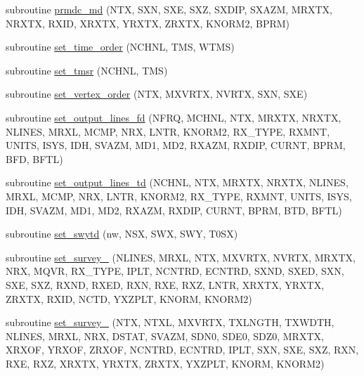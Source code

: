 \begin{DoxyCompactItemize}
\item 
subroutine \hyperlink{Leroi__c_8f90_a2212318f6dd3a1fda873532ddfb09348}{prmdc\+\_\+md} (N\+TX, S\+XN, S\+XE, S\+XZ, S\+X\+D\+IP, S\+X\+A\+ZM, M\+R\+X\+TX, N\+R\+X\+TX, R\+X\+ID, X\+R\+X\+TX, Y\+R\+X\+TX, Z\+R\+X\+TX, K\+N\+O\+R\+M2, B\+P\+RM)
\item 
subroutine \hyperlink{Leroi__c_8f90_ab7ca289c09589698d4ff1bd15e1a16e6}{set\+\_\+time\+\_\+order} (N\+C\+H\+NL, T\+MS, W\+T\+MS)
\item 
subroutine \hyperlink{Leroi__c_8f90_a404aa1badfba9369219343ec158c37ca}{set\+\_\+tmsr} (N\+C\+H\+NL, T\+MS)
\item 
subroutine \hyperlink{Leroi__c_8f90_a0cb3e794e8c12de92dbc3e157d7991c4}{set\+\_\+vertex\+\_\+order} (N\+TX, M\+X\+V\+R\+TX, N\+V\+R\+TX, S\+XN, S\+XE)
\item 
subroutine \hyperlink{Leroi__c_8f90_a25dab6f0be9119c8c046915473136d9c}{set\+\_\+output\+\_\+lines\+\_\+fd} (N\+F\+RQ, M\+C\+H\+NL, N\+TX, M\+R\+X\+TX, N\+R\+X\+TX, N\+L\+I\+N\+ES, M\+R\+XL, M\+C\+MP, N\+RX, L\+N\+TR, K\+N\+O\+R\+M2, R\+X\+\_\+\+T\+Y\+PE, R\+X\+M\+NT, U\+N\+I\+TS, I\+S\+YS, I\+DH, S\+V\+A\+ZM, M\+D1, M\+D2, R\+X\+A\+ZM, R\+X\+D\+IP, C\+U\+R\+NT, B\+P\+RM, B\+FD, B\+F\+TL)
\item 
subroutine \hyperlink{Leroi__c_8f90_a2a5820b2a223f63d10cd7fe63469c604}{set\+\_\+output\+\_\+lines\+\_\+td} (N\+C\+H\+NL, N\+TX, M\+R\+X\+TX, N\+R\+X\+TX, N\+L\+I\+N\+ES, M\+R\+XL, M\+C\+MP, N\+RX, L\+N\+TR, K\+N\+O\+R\+M2, R\+X\+\_\+\+T\+Y\+PE, R\+X\+M\+NT, U\+N\+I\+TS, I\+S\+YS, I\+DH, S\+V\+A\+ZM, M\+D1, M\+D2, R\+X\+A\+ZM, R\+X\+D\+IP, C\+U\+R\+NT, B\+P\+RM, B\+TD, B\+F\+TL)
\item 
subroutine \hyperlink{Leroi__c_8f90_a070fa81fa07083804479fa6b78707607}{set\+\_\+swytd} (nw, N\+SX, S\+WX, S\+WY, T0\+SX)
\item 
subroutine \hyperlink{Leroi__c_8f90_a27012846f79c1bc36d500442dad45d7c}{set\+\_\+survey\+\_} (N\+L\+I\+N\+ES, M\+R\+XL, N\+TX, M\+X\+V\+R\+TX, N\+V\+R\+TX, M\+R\+X\+TX, N\+RX, M\+Q\+VR, R\+X\+\_\+\+T\+Y\+PE, I\+P\+LT, N\+C\+N\+T\+RD, E\+C\+N\+T\+RD, S\+X\+ND, S\+X\+ED, S\+XN, S\+XE, S\+XZ, R\+X\+ND, R\+X\+ED, R\+XN, R\+XE, R\+XZ, L\+N\+TR, X\+R\+X\+TX, Y\+R\+X\+TX, Z\+R\+X\+TX, R\+X\+ID, N\+C\+TD, Y\+X\+Z\+P\+LT, K\+N\+O\+RM, K\+N\+O\+R\+M2)
\item 
subroutine \hyperlink{Leroi__c_8f90_a8b4a76899e2dcc9f323ef19f765d6679}{set\+\_\+survey\+\_} (N\+TX, N\+T\+XL, M\+X\+V\+R\+TX, T\+X\+L\+N\+G\+TH, T\+X\+W\+D\+TH, N\+L\+I\+N\+ES, M\+R\+XL, N\+RX, D\+S\+T\+AT, S\+V\+A\+ZM, S\+D\+N0, S\+D\+E0, S\+D\+Z0, M\+R\+X\+TX, X\+R\+X\+OF, Y\+R\+X\+OF, Z\+R\+X\+OF, N\+C\+N\+T\+RD, E\+C\+N\+T\+RD, I\+P\+LT, S\+XN, S\+XE, S\+XZ, R\+XN, R\+XE, R\+XZ, X\+R\+X\+TX, Y\+R\+X\+TX, Z\+R\+X\+TX, Y\+X\+Z\+P\+LT, K\+N\+O\+RM, K\+N\+O\+R\+M2)

\end{DoxyCompactItemize}
